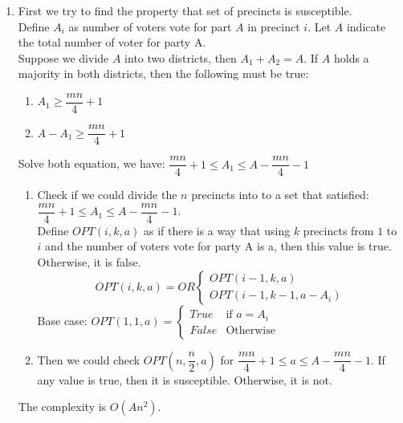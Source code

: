 \documentclass{article}
\begin{document}
\begin{enumerate}
\item
First we try to find the property that set of precincts is susceptible. \\
Define $A_i$ as number of voters vote for part $A$ in precinct $i$. Let $A$ indicate the total number of voter for party A.\\
Suppose we divide $A$ into two districts, then $A_1 + A_2 = A$. If $A$ holds a majority in both districts, then the following must be true:
\begin{enumerate}
\item $A_1 \geqslant \dfrac{mn}{4} + 1$\\
\item $A - A_1 \geqslant \dfrac{mn}{4} + 1$\\
\end{enumerate}
Solve both equation, we have: $\dfrac{mn}{4} + 1 \leqslant A_1 \leqslant A - \dfrac{mn}{4} - 1$ \\
\begin{enumerate}
\item
Check if we could divide the $n$ precincts into to a set that satisfied: $\dfrac{mn}{4} + 1 \leqslant A_1 \leqslant A - \dfrac{mn}{4} - 1$.  \\
Define $OPT(i,k,a)$ as if there is a way that using $k$ precincts from $1$ to $i$ and the number of voters vote for party A is a, then this value is true. Otherwise, it is false.\\
\begin{equation}
OPT(i,k,a) = OR
\begin{cases}
OPT(i-1,k,a) \\
OPT(i-1,k-1,a-A_i)
\end{cases}
\end{equation}
Base case: $OPT(1,1,a) = 
\begin{cases}
True &\text{if } a = A_i \\
False &\text{Otherwise}
\end{cases}$
\item Then we could check $OPT(n, \dfrac{n}{2}, a)$ for $\dfrac{mn}{4} + 1 \leqslant a \leqslant A - \dfrac{mn}{4} - 1$. If any value is true, then it is susceptible. Otherwise, it is not. \\

\end{enumerate}
The complexity is $O(An^2)$.

\end{enumerate}
\end{document}
